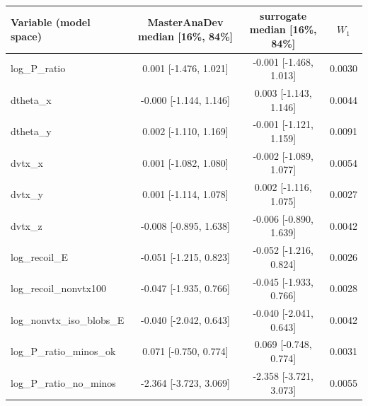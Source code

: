 \begin{tabular}{lccc}
\toprule
Variable (model space) & MasterAnaDev median [16\%, 84\%] & surrogate median [16\%, 84\%] & $W_1$ \\
\midrule
log\_P\_ratio & 0.001 [-1.476, 1.021] & -0.001 [-1.468, 1.013] & 0.0030 \\
dtheta\_x & -0.000 [-1.144, 1.146] & 0.003 [-1.143, 1.146] & 0.0044 \\
dtheta\_y & 0.002 [-1.110, 1.169] & -0.001 [-1.121, 1.159] & 0.0091 \\
dvtx\_x & 0.001 [-1.082, 1.080] & -0.002 [-1.089, 1.077] & 0.0054 \\
dvtx\_y & 0.001 [-1.114, 1.078] & 0.002 [-1.116, 1.075] & 0.0027 \\
dvtx\_z & -0.008 [-0.895, 1.638] & -0.006 [-0.890, 1.639] & 0.0042 \\
log\_recoil\_E & -0.051 [-1.215, 0.823] & -0.052 [-1.216, 0.824] & 0.0026 \\
log\_recoil\_nonvtx100 & -0.047 [-1.935, 0.766] & -0.045 [-1.933, 0.766] & 0.0028 \\
log\_nonvtx\_iso\_blobs\_E & -0.040 [-2.042, 0.643] & -0.040 [-2.041, 0.643] & 0.0042 \\
log\_P\_ratio\_minos\_ok & 0.071 [-0.750, 0.774] & 0.069 [-0.748, 0.774] & 0.0031 \\
log\_P\_ratio\_no\_minos & -2.364 [-3.723, 3.069] & -2.358 [-3.721, 3.073] & 0.0055 \\
\bottomrule
\end{tabular}
